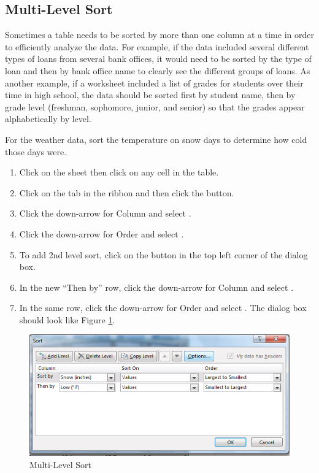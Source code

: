 \subsection{Multi-Level Sort}

Sometimes a table needs to be sorted by more than one column at a time in order to efficiently analyze the data. For example, if the data included several different types of loans from several bank offices, it would need to be sorted by the type of loan and then by bank office name to clearly see the different groups of loans. As another example, if a worksheet included a list of grades for students over their time in high school, the data should be sorted first by student name, then by grade level (freshman, sophomore, junior, and senior) so that the grades appear alphabetically by level.

For the weather data, sort the temperature on snow days to determine how cold those days were.

\begin{enumerate}
	\item Click on the  sheet then click on any cell in the table.
	\item Click on the  tab in the ribbon and then click the  button.
	\item Click the down-arrow for Column and select .
	\item Click the down-arrow for Order and select .
	\item To add 2nd level sort, click on the  button in the top left corner of the dialog box.
	\item In the new ``Then by'' row, click the down-arrow for Column and select .
	\item In the same row, click the down-arrow for Order and select . The dialog box should look like Figure \ref{05:fig11}.
\end{enumerate}

\begin{figure}[H]
	\centering
	\includegraphics[width=\maxwidth{.95\linewidth}]{gfx/ch05_fig11}
	\caption{Multi-Level Sort}
	\label{05:fig11}
\end{figure}

